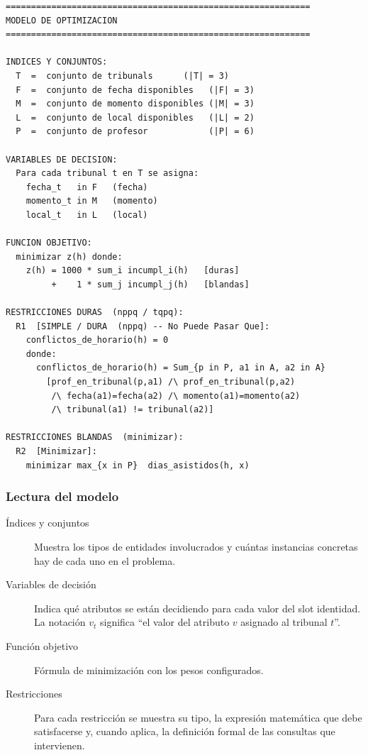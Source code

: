 \documentclass[12pt,a4paper]{article}
\begin{document}
\begin{lstlisting}[style=output]
============================================================
MODELO DE OPTIMIZACION
============================================================

INDICES Y CONJUNTOS:
  T  =  conjunto de tribunals      (|T| = 3)
  F  =  conjunto de fecha disponibles   (|F| = 3)
  M  =  conjunto de momento disponibles (|M| = 3)
  L  =  conjunto de local disponibles   (|L| = 2)
  P  =  conjunto de profesor            (|P| = 6)

VARIABLES DE DECISION:
  Para cada tribunal t en T se asigna:
    fecha_t   in F   (fecha)
    momento_t in M   (momento)
    local_t   in L   (local)

FUNCION OBJETIVO:
  minimizar z(h) donde:
    z(h) = 1000 * sum_i incumpl_i(h)   [duras]
         +    1 * sum_j incumpl_j(h)   [blandas]

RESTRICCIONES DURAS  (nppq / tqpq):
  R1  [SIMPLE / DURA  (nppq) -- No Puede Pasar Que]:
    conflictos_de_horario(h) = 0
    donde:
      conflictos_de_horario(h) = Sum_{p in P, a1 in A, a2 in A}
        [prof_en_tribunal(p,a1) /\ prof_en_tribunal(p,a2)
         /\ fecha(a1)=fecha(a2) /\ momento(a1)=momento(a2)
         /\ tribunal(a1) != tribunal(a2)]

RESTRICCIONES BLANDAS  (minimizar):
  R2  [Minimizar]:
    minimizar max_{x in P}  dias_asistidos(h, x)
\end{lstlisting}

\subsubsection{Lectura del modelo}

\begin{description}
  \item[Índices y conjuntos] Muestra los tipos de entidades involucrados
    y cuántas instancias concretas hay de cada uno en el problema.

  \item[Variables de decisión] Indica qué atributos se están decidiendo
    para cada valor del slot identidad. La notación $v_t$ significa
    ``el valor del atributo $v$ asignado al tribunal $t$''.

  \item[Función objetivo] Fórmula de minimización con los pesos configurados.

  \item[Restricciones] Para cada restricción se muestra su tipo,
    la expresión matemática que debe satisfacerse y, cuando aplica,
    la definición formal de las consultas que intervienen.
\end{description}
\end{document}
